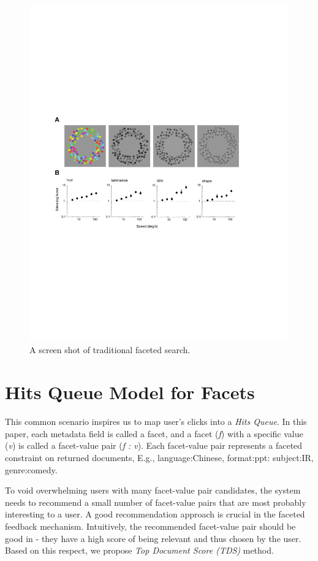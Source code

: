 \begin{figure}
\includegraphics[width=\textwidth]{figures/fig1}
\caption[Traditional Faceted Search.]{A screen shot of traditional faceted search.
\label{fig:myInlineFigure}}
\end{figure}

\section{Hits Queue Model for Facets}

This common scenario inspires us to map user's clicks into a {\it Hits Queue}. In this paper, each metadata field is called a facet, and a facet ({\it f}) with a specific value ({\it v}) is called a facet-value pair ({\it f : v}). Each facet-value pair represents a faceted constraint on returned documents, E.g., language:Chinese, format:ppt: subject:IR, genre:comedy.

To void overwhelming users with many facet-value pair candidates, the system needs to recommend a small number of facet-value pairs that are most probably interesting to a user. A good recommendation approach is crucial in the faceted feedback mechanism. Intuitively, the recommended facet-value pair should be good in - they have a high score of being relevant and thus chosen by the user. Based on this respect, we propose {\it Top Document Score (TDS)} method. 

